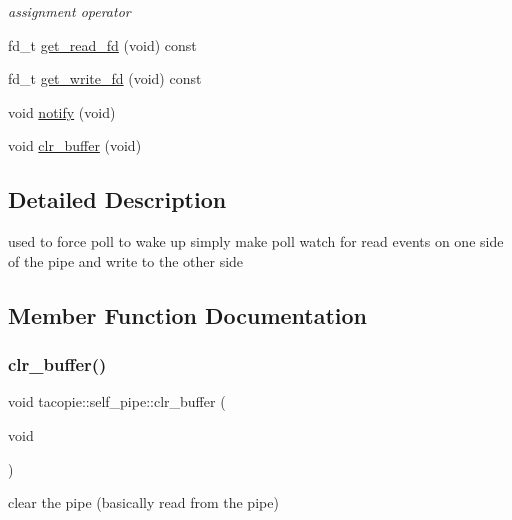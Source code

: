 \begin{DoxyCompactItemize}
\begin{DoxyCompactList}\small\item\em assignment operator \end{DoxyCompactList}\item 
fd\+\_\+t \hyperlink{classtacopie_1_1self__pipe_a301b416f5f8236a383065b381385b88c}{get\+\_\+read\+\_\+fd} (void) const
\item 
fd\+\_\+t \hyperlink{classtacopie_1_1self__pipe_ab36a4deb45bb408988f26315aedc0d74}{get\+\_\+write\+\_\+fd} (void) const
\item 
void \hyperlink{classtacopie_1_1self__pipe_ade9e0e3d19b8d4d22977935a578d508e}{notify} (void)
\item 
void \hyperlink{classtacopie_1_1self__pipe_a4f55a34bd882d59bdcc73b87222ba3d8}{clr\+\_\+buffer} (void)
\end{DoxyCompactItemize}


\subsection{Detailed Description}
used to force poll to wake up simply make poll watch for read events on one side of the pipe and write to the other side 

\subsection{Member Function Documentation}
\mbox{\label{classtacopie_1_1self__pipe_a4f55a34bd882d59bdcc73b87222ba3d8}} 
\subsubsection{\texorpdfstring{clr\+\_\+buffer()}{clr\_buffer()}}
{\footnotesize\ttfamily void tacopie\+::self\+\_\+pipe\+::clr\+\_\+buffer (\begin{DoxyParamCaption}\item[{void}]{ }\end{DoxyParamCaption})}

clear the pipe (basically read from the pipe) \mbox{\label{classtacopie_1_1self__pipe_a301b416f5f8236a383065b381385b88c}} 
